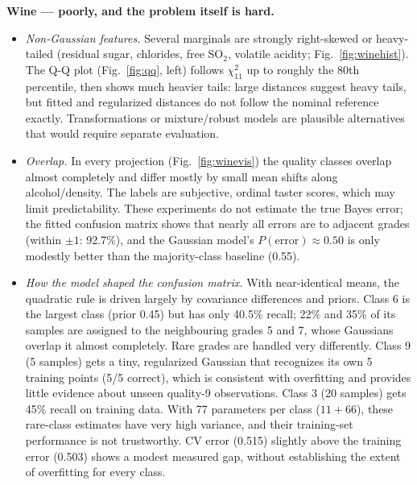 \documentclass[10pt]{article}
\begin{document}
\textbf{Wine --- poorly, and the problem itself is hard.}
\begin{itemize}
\item \emph{Non-Gaussian features.} Several marginals are strongly right-skewed or heavy-tailed (residual sugar, chlorides, free SO$_2$, volatile acidity; Fig.~\ref{fig:winehist}). The Q-Q plot (Fig.~\ref{fig:qq}, left) follows $\chi^2_{11}$ up to roughly the 80th percentile, then shows much heavier tails: large distances suggest heavy tails, but fitted and regularized distances do not follow the nominal reference exactly. Transformations or mixture/robust models are plausible alternatives that would require separate evaluation.
\item \emph{Overlap.} In every projection (Fig.~\ref{fig:winevis}) the quality classes overlap almost completely and differ mostly by small mean shifts along alcohol/density. The labels are subjective, ordinal taster scores, which may limit predictability. These experiments do not estimate the true Bayes error; the fitted confusion matrix shows that nearly all errors are to adjacent grades (within $\pm1$: 92.7\%), and the Gaussian model's $P(\text{error})\approx0.50$ is only modestly better than the majority-class baseline (0.55).
\item \emph{How the model shaped the confusion matrix.} With near-identical means, the quadratic rule is driven largely by covariance differences and priors. Class 6 is the largest class (prior 0.45) but has only 40.5\% recall; 22\% and 35\% of its samples are assigned to the neighbouring grades 5 and 7, whose Gaussians overlap it almost completely. Rare grades are handled very differently. Class 9 (5 samples) gets a tiny, regularized Gaussian that recognizes its own 5 training points (5/5 correct), which is consistent with overfitting and provides little evidence about unseen quality-9 observations. Class 3 (20 samples) gets 45\% recall on training data. With 77 parameters per class ($11+66$), these rare-class estimates have very high variance, and their training-set performance is not trustworthy. CV error (0.515) slightly above the training error (0.503) shows a modest measured gap, without establishing the extent of overfitting for every class.
\end{itemize}
\end{document}
